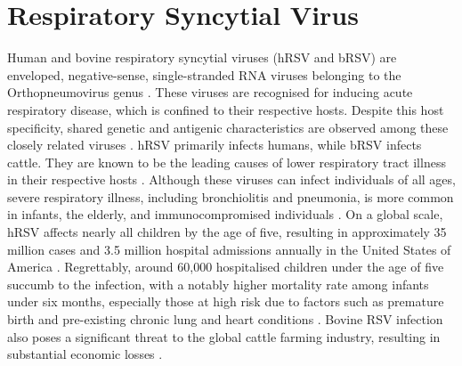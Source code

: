 \section{Respiratory Syncytial Virus} \label{sec:Respiratory Syncytial Virus}
Human and bovine respiratory syncytial viruses (hRSV and bRSV) are enveloped, negative-sense, single-stranded RNA viruses belonging to the Orthopneumovirus genus \cite{Afonso2016Taxonomy2016}. These viruses are recognised for inducing acute respiratory disease, which is confined to their respective hosts. Despite this host specificity, shared genetic and antigenic characteristics are observed among these closely related viruses \cite{Buchholz2000ChimericVaccine}. hRSV primarily infects humans, while bRSV infects cattle. They are known to be the leading causes of lower respiratory tract illness in their respective hosts \cite{Nair2013GlobalAnalysis, Sacco2014RespiratoryCattle}. Although these viruses can infect individuals of all ages, severe respiratory illness, including bronchiolitis and pneumonia, is more common in infants, the elderly, and immunocompromised individuals \cite{Falsey2005RespiratoryAdults, Coultas2019RespiratoryAge}. On a global scale, hRSV affects nearly all children by the age of five, resulting in approximately 35 million cases and 3.5 million hospital admissions annually in the United States of America \cite{Shi2017GlobalStudy}. Regrettably, around 60,000 hospitalised children under the age of five succumb to the infection, with a notably higher mortality rate among infants under six months, especially those at high risk due to factors such as premature birth and pre-existing chronic lung and heart conditions \cite{Shi2017GlobalStudy, Jha2016RespiratoryVirus, Coultas2019RespiratoryAge}. Bovine RSV infection also poses a significant threat to the global cattle farming industry, resulting in substantial economic losses \cite{Brodersen2010BovineVirus, Valarcher2007BovineInfection}.

